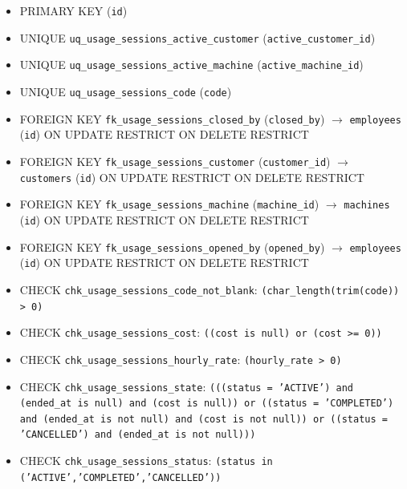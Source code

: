 \begin{itemize}

\item PRIMARY KEY (\texttt{id})

\item UNIQUE \texttt{uq\_usage\_sessions\_active\_customer} (\texttt{active\_customer\_id})

\item UNIQUE \texttt{uq\_usage\_sessions\_active\_machine} (\texttt{active\_machine\_id})

\item UNIQUE \texttt{uq\_usage\_sessions\_code} (\texttt{code})

\item FOREIGN KEY \texttt{fk\_usage\_sessions\_closed\_by} (\texttt{closed\_by}) $\rightarrow$ \texttt{employees} (\texttt{id}) ON UPDATE RESTRICT ON DELETE RESTRICT

\item FOREIGN KEY \texttt{fk\_usage\_sessions\_customer} (\texttt{customer\_id}) $\rightarrow$ \texttt{customers} (\texttt{id}) ON UPDATE RESTRICT ON DELETE RESTRICT

\item FOREIGN KEY \texttt{fk\_usage\_sessions\_machine} (\texttt{machine\_id}) $\rightarrow$ \texttt{machines} (\texttt{id}) ON UPDATE RESTRICT ON DELETE RESTRICT

\item FOREIGN KEY \texttt{fk\_usage\_sessions\_opened\_by} (\texttt{opened\_by}) $\rightarrow$ \texttt{employees} (\texttt{id}) ON UPDATE RESTRICT ON DELETE RESTRICT

\item CHECK \texttt{chk\_usage\_sessions\_code\_not\_blank}: \texttt{(char\_length(trim(code)) > 0)}

\item CHECK \texttt{chk\_usage\_sessions\_cost}: \texttt{((cost is null) or (cost >= 0))}

\item CHECK \texttt{chk\_usage\_sessions\_hourly\_rate}: \texttt{(hourly\_rate > 0)}

\item CHECK \texttt{chk\_usage\_sessions\_state}: \texttt{(((status = 'ACTIVE') and (ended\_at is null) and (cost is null)) or ((status = 'COMPLETED') and (ended\_at is not null) and (cost is not null)) or ((status = 'CANCELLED') and (ended\_at is not null)))}

\item CHECK \texttt{chk\_usage\_sessions\_status}: \texttt{(status in ('ACTIVE','COMPLETED','CANCELLED'))}


\end{itemize}
